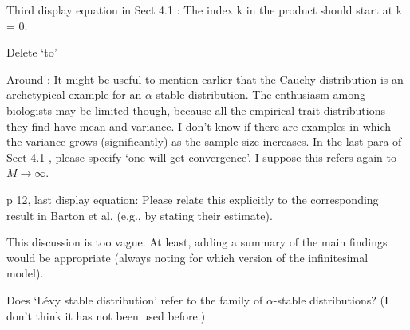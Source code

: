 
\begin{point}{\revref}
Third display equation in Sect 4.1 \revref: The index k in the product should start at k = 0.
\end{point}


\begin{point}{\revref}
Delete ‘to’
\end{point}


\begin{point}{}
Around : It might be useful to mention earlier that the Cauchy distribution is an archetypical
example for an $\alpha$-stable distribution. The enthusiasm among biologists may be limited
though, because all the empirical trait distributions they find have mean and variance. I
don’t know if there are examples in which the variance grows (significantly) as the sample
size increases. In the last para of Sect 4.1 \revref, please specify ‘one will get convergence’. I
suppose this refers again to $M \to \infty$.
\end{point}


\begin{point}{}
p 12, last display equation: Please relate this explicitly to the corresponding result in
Barton et al. (e.g., by stating their estimate).
\end{point}


\begin{point}{\revref}
This discussion is too vague. At least, adding a summary of the main findings
would be appropriate (always noting for which version of the infinitesimal model).
\end{point}


\begin{point}{\revref}
Does `Lévy stable distribution’ refer to the family of $\alpha$-stable
distributions? (I don’t think it has not been used before.)
\end{point}

